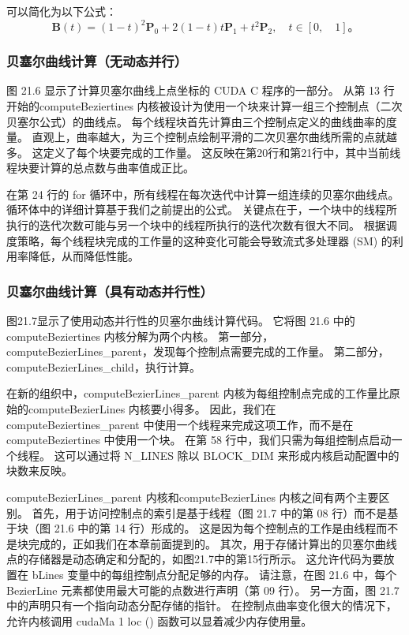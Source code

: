 可以简化为以下公式：
$$
\mathbf{B}(t)=(1-t)^{2} \mathbf{P}_{0}+2(1-t) t \mathbf{P}_{1}+t^{2} \mathbf{P}_{2}, \quad t \in[0, \quad 1] 。
$$

\subsubsection{贝塞尔曲线计算（无动态并行）}
图 21.6 显示了计算贝塞尔曲线上点坐标的 CUDA C 程序的一部分。 
从第 13 行开始的computeBeziertines 内核被设计为使用一个块来计算一组三个控制点（二次贝塞尔公式）的曲线点。 
每个线程块首先计算由三个控制点定义的曲线曲率的度量。 直观上，曲率越大，为三个控制点绘制平滑的二次贝塞尔曲线所需的点就越多。 
这定义了每个块要完成的工作量。 这反映在第20行和第21行中，其中当前线程块要计算的总点数与曲率值成正比。

在第 24 行的 for 循环中，所有线程在每次迭代中计算一组连续的贝塞尔曲线点。 循环体中的详细计算基于我们之前提出的公式。 
关键点在于，一个块中的线程所执行的迭代次数可能与另一个块中的线程所执行的迭代次数有很大不同。 
根据调度策略，每个线程块完成的工作量的这种变化可能会导致流式多处理器 (SM) 的利用率降低，从而降低性能。

\subsubsection{贝塞尔曲线计算（具有动态并行性）}
图21.7显示了使用动态并行性的贝塞尔曲线计算代码。 它将图 21.6 中的computeBeziertines 内核分解为两个内核。 
第一部分，computeBezierLines\_parent，发现每个控制点需要完成的工作量。 
第二部分，computeBezierLines\_child，执行计算。

在新的组织中，computeBezierLines\_parent 内核为每组控制点完成的工作量比原始的computeBezierLines 内核要小得多。 
因此，我们在computeBeziertines\_parent 中使用一个线程来完成这项工作，而不是在computeBeziertines 中使用一个块。 
在第 58 行中，我们只需为每组控制点启动一个线程。 这可以通过将 N\_LINES 除以 BLOCK\_DIM 来形成内核启动配置中的块数来反映。

computeBezierLines\_parent 内核和computeBezierLines 内核之间有两个主要区别。 
首先，用于访问控制点的索引是基于线程（图 21.7 中的第 08 行）而不是基于块（图 21.6 中的第 14 行）形成的。 
这是因为每个控制点的工作是由线程而不是块完成的，正如我们在本章前面提到的。 
其次，用于存储计算出的贝塞尔曲线点的存储器是动态确定和分配的，如图21.7中的第15行所示。 
这允许代码为要放置在 bLines 变量中的每组控制点分配足够的内存。 
请注意，在图 21.6 中，每个 BezierLine 元素都使用最大可能的点数进行声明（第 09 行）。 
另一方面，图 21.7 中的声明只有一个指向动态分配存储的指针。 
在控制点曲率变化很大的情况下，允许内核调用 cudaMa 1 loc () 函数可以显着减少内存使用量。

